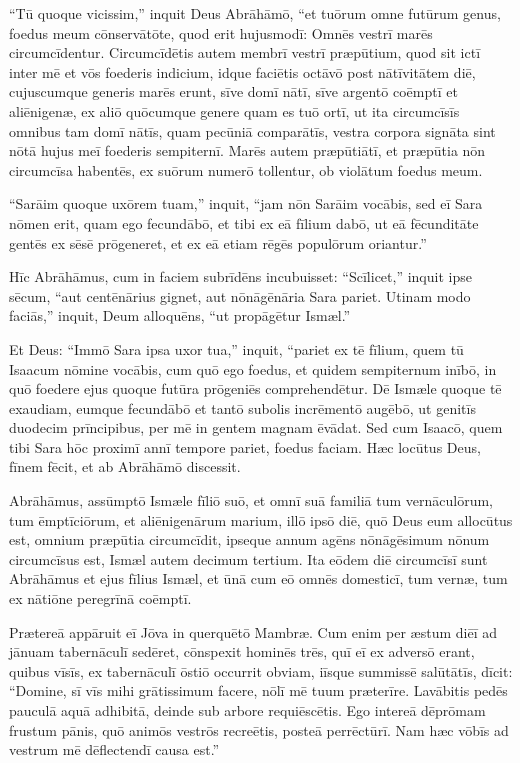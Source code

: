 \Versus ``Tū quoque vicissim,'' inquit Deus Abrāhāmō, ``et tuōrum omne futūrum genus, foedus meum cōnservātōte,
\Versus quod erit hujusmodī: Omnēs vestrī marēs circumcīdentur.
\Versus Circumcīdētis autem membrī vestrī præpūtium, quod sit ictī inter mē et vōs foederis indicium,
\Versus idque faciētis octāvō post nātīvitātem diē, cujuscumque generis marēs erunt, sīve domī nātī, sīve argentō coēmptī et aliēnigenæ, ex aliō quōcumque genere quam es tuō ortī,
\Versus ut ita circumcīsīs omnibus tam domī nātīs, quam pecūniā comparātīs, vestra corpora signāta sint nōtā hujus meī foederis sempiternī.
\Versus  Marēs autem præpūtiātī, et præpūtia nōn circumcīsa habentēs, ex suōrum numerō tollentur, ob violātum foedus meum.

\Versus ``Sarāim quoque uxōrem tuam,'' inquit, ``jam nōn Sarāim vocābis, sed eī Sara nōmen erit,
\Versus quam ego fecundābō, et tibi ex eā fīlium dabō, ut eā fēcunditāte gentēs ex sēsē prōgeneret, et ex eā etiam rēgēs populōrum oriantur.''

\Versus Hīc Abrāhāmus, cum in faciem subrīdēns incubuisset: ``Scīlicet,'' inquit ipse sēcum, ``aut centēnārius gignet, aut nōnāgēnāria Sara pariet.
\Versus Utinam modo faciās,'' inquit, Deum alloquēns, ``ut propāgētur Ismæl.''

\Versus Et Deus: ``Immō Sara ipsa uxor tua,'' inquit, ``pariet ex tē fīlium, quem tū Isaacum nōmine vocābis, cum quō ego foedus, et quidem sempiternum inībō, in quō foedere ejus quoque futūra prōgeniēs comprehendētur.
\Versus Dē Ismæle quoque tē exaudiam, eumque fecundābō et tantō subolis incrēmentō augēbō, ut genitīs duodecim prīncipibus, per mē in gentem magnam ēvādat.
\Versus Sed cum Isaacō, quem tibi Sara hōc proximī annī tempore pariet, foedus faciam. 
\Versus Hæc locūtus Deus, fīnem fēcit, et ab Abrāhāmō discessit.

\Versus Abrāhāmus, assūmptō Ismæle fīliō suō, et omnī suā familiā tum vernāculōrum, tum ēmptīciōrum, et aliēnigenārum marium, illō ipsō diē, quō Deus eum allocūtus est, omnium præpūtia circumcīdit,
\Versus ipseque annum agēns nōnāgēsimum nōnum circumcīsus est,
\Versus Ismæl autem decimum tertium.
\Versus Ita eōdem diē circumcīsī sunt Abrāhāmus et ejus fīlius Ismæl,
\Versus et ūnā cum eō omnēs domesticī, tum vernæ, tum ex nātiōne peregrīnā coēmptī.



\Caput
\Versus Prætereā appāruit eī Jōva in querquētō Mambræ. Cum enim per æstum diēī ad jānuam tabernāculī sedēret,
\Versus cōnspexit hominēs trēs, quī eī ex adversō erant, quibus vīsīs, ex tabernāculī ōstiō occurrit obviam, iīsque summissē salūtātīs, dīcit:
\Versus ``Domine, sī vīs mihi grātissimum facere, nōlī mē tuum præterīre.
\Versus Lavābitis pedēs pauculā aquā adhibitā, deinde sub arbore requiēscētis.
\Versus Ego intereā dēprōmam frustum pānis, quō animōs vestrōs recreētis, posteā perrēctūrī. Nam hæc vōbīs ad vestrum mē dēflectendī causa est.''

